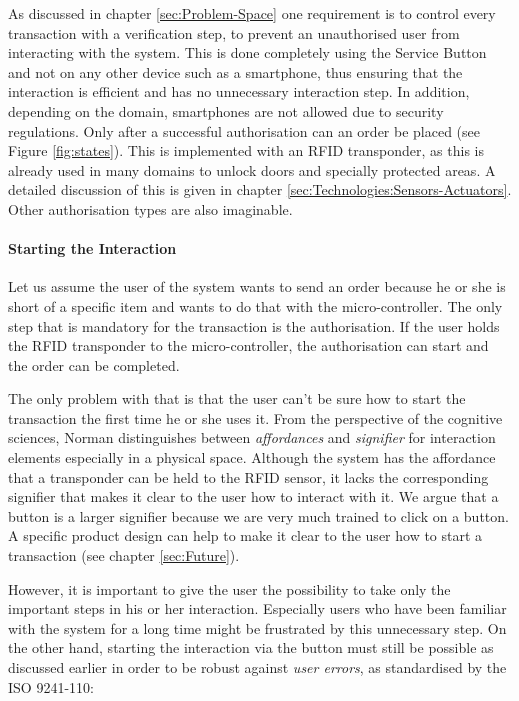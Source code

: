 As discussed in chapter \ref{sec:Problem-Space} one requirement is to control every transaction with a verification step, to prevent an unauthorised user from interacting with the system. This is done completely using the Service Button and not on any other device such as a smartphone, thus ensuring that the interaction is efficient and has no unnecessary interaction step. In addition, depending on the domain, smartphones are not allowed due to security regulations. Only after a successful authorisation can an order be placed (see Figure \ref{fig:states}). This is implemented with an RFID transponder, as this is already used in many domains to unlock doors and specially protected areas. A detailed discussion of this is given in chapter \ref{sec:Technologies:Sensors-Actuators}. Other authorisation types are also imaginable.

\paragraph{Starting the Interaction}
Let us assume the user of the system wants to send an order because he or she is short of a specific item and wants to do that with the micro-controller. The only step that is mandatory for the transaction is the authorisation. If the user holds the RFID transponder to the micro-controller, the authorisation can start and the order can be completed.

The only problem with that is that the user can't be sure how to start the transaction the first time he or she uses it. From the perspective of the cognitive sciences, Norman distinguishes between \textit{affordances} and \textit{signifier} for interaction elements \cite{Norman:EverydayThings:2013} especially in a physical space. Although the system has the affordance that a transponder can be held to the RFID sensor, it lacks the corresponding signifier that makes it clear to the user how to interact with it. We argue that a button is a larger signifier because we are very much trained to click on a button. A specific product design can help to make it clear to the user how to start a transaction (see chapter \ref{sec:Future}).

However, it is important to give the user the possibility to take only the important steps in his or her interaction. Especially users who have been familiar with the system for a long time might be frustrated by this unnecessary step. On the other hand, starting the interaction via the button must still be possible as discussed earlier in order to be robust against \textit{user errors}, as standardised by the ISO 9241-110:

